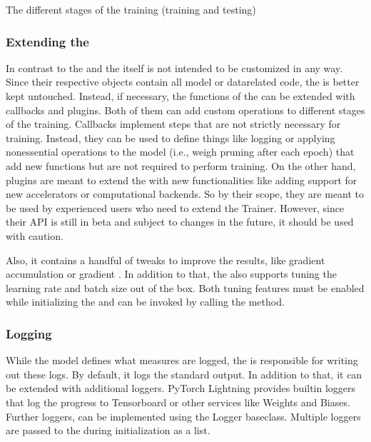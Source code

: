 \documentclass[letterpaper,10pt,english]{jupyterBook}
\begin{document}
\sphinxAtStartPar
The different stages of the training (training and testing)


\subsubsection{Extending the }
\label{\detokenize{PyTorchLightning:extending-the-trainer}}
\sphinxAtStartPar
In contrast to the  and  the  itself is not intended to be customized in any way. Since their respective objects contain all model or data\sphinxhyphen{}related code, the  is better kept untouched.
Instead, if necessary, the functions of the  can be extended with callbacks and plugins. Both of them can add custom operations to different stages of the training.
Callbacks implement steps that are not strictly necessary for training. Instead, they can be used to define things like logging or applying non\sphinxhyphen{}essential operations to the model (i.e., weigh pruning after each epoch) that add new functions but are not required to perform training.
On the other hand, plugins are meant to extend the  with new functionalities like adding support for new accelerators or computational backends. So by their scope, they are meant to be used by experienced users who need to extend the Trainer.
However, since their API is still in beta and subject to changes in the future, it should be used with caution.

\sphinxAtStartPar
Also, it contains a handful of tweaks to improve the results, like gradient accumulation or gradient .
In addition to that, the  also supports tuning the learning rate and batch size out of the box. Both tuning features must be enabled while initializing the  and can be invoked by calling the \sphinxhyphen{}method.


\subsubsection{Logging}
\label{\detokenize{PyTorchLightning:id2}}
\sphinxAtStartPar
While the model defines what measures are logged, the  is responsible for writing out these logs.
By default, it logs the standard output.
In addition to that, it can be extended with additional loggers.
PyTorch Lightning provides built\sphinxhyphen{}in loggers that log the progress to Tensorboard or other services like Weights and Biases.
Further loggers, can be implemented using the Logger base\sphinxhyphen{}class.
Multiple loggers are passed to the  during initialization as a list.
\end{document}
